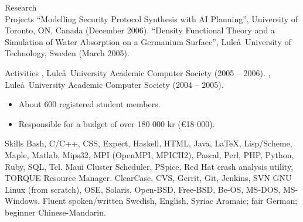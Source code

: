 \documentclass{../../cls/cv}
\begin{document}
\begin{category}{Research \\ Projects}
\citembullet ``Modelling Security Protocol Synthesis with AI Planning'', University of Toronto, ON, Canada (December 2006).
\citembullet ``Density Functional Theory and a Simulation of Water Absorption on a Germanium Surface'', Lule\aa\ University of Technology, Sweden (March 2005).
\end{category}


\begin{category}{Activities}
, Lule\aa \ University Academic
Computer Society (2005 -- 2006).
, Lule\aa \ University Academic Computer Society
(2004 -- 2005).
\begin{itemize}
\item About $600$ registered student members.
\item Responsible for a budget of over 180 000 kr (\euro18 000).
\end{itemize}
\end{category}

\begin{category}{Skills}
\citembullet Bash, C/C++, CSS, Expect, Haskell, HTML, Java, \LaTeX, Lisp/Scheme, Maple, Matlab,
Mips32, MPI (OpenMPI, MPICH2), Pascal, Perl, PHP, Python, Ruby, SQL, Tcl.
\citembullet Maui Cluster Scheduler, PSpice, Red Hat crash analysis utility, TORQUE Resource Manager.
\citembullet ClearCase, CVS, Gerrit, Git, Jenkins, SVN
\citembullet GNU Linux (from scratch), OSE, Solaris, Open-BSD, Free-BSD, Be-OS, MS-DOS, MS-Windows.
\citembullet Fluent spoken/written Swedish, English, Syriac Aramaic;
fair German; \\ beginner Chinese-Mandarin.
\end{category}


\end{document}
